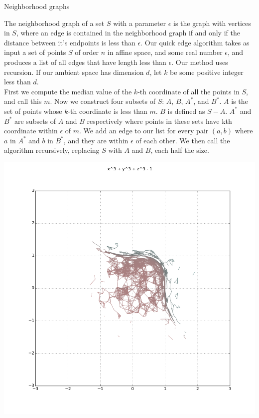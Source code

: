 \documentclass{beamer}
\begin{document}
\begin{frame}{}
\begin{columns}[t]
\begin{column}{0.32\linewidth}
\begin{block}{Neighborhood graphs}

The neighborhood graph of a set $S$ with a parameter $\epsilon$ is the graph with vertices in $S$, where an edge is contained in the neighborhood graph if and only if the distance between it's endpoints is less than $\epsilon$. Our quick edge algorithm takes as input a set of points $S$ of order $n$ in affine space, and some real number $\epsilon$, and produces a list of all edges that have length less than $\epsilon$. Our method uses recursion. If our ambient space has dimension $d$, let $k$ be some positive integer less than $d$. 
\\

First we compute the median value of the $k$-th coordinate of all the points in $S$, and call this $m$. Now we construct four subsets of $S$: $A$, $B$, $A^*$, and $B^*$. $A$ is the set of points whose $k$-th coordinate is less than $m$. $B$ is defined as $S-A$. $A^*$ and $B^*$ are subsets of $A$ and $B$ respectively where points in these sets have kth coordinate within $\epsilon$ of $m$. We add an edge to our list for every pair $(a,b)$ where $a$ in $A^*$ and $b$ in $B^*$, and they are within $\epsilon$ of each other. We then call the algorithm recursively, replacing $S$ with $A$ and $B$, each half the size.

\includegraphics[width=1\columnwidth]{plot2d_ng_7}
\end{block}


\end{column}
\end{columns}
\end{frame}
\end{document}
